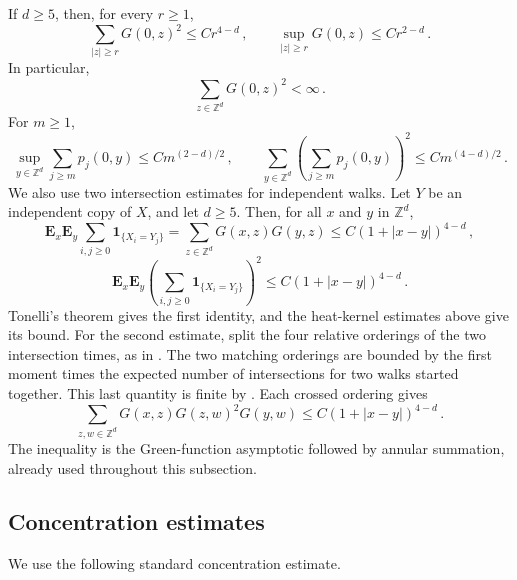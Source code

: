 \documentclass[11pt]{amsart}
\theoremstyle{plain}
\theoremstyle{definition}
\newcommand{\Z}{\mathbb{Z}}
\newcommand{\one}{\mathbf{1}}
\begin{document}
	If $d\geq5$, then, for every $r\geq1$,
	\begin{equation}\label{eq:dgt4-green-tail}
		\sum_{|z|\geq r}G(0,z)^2\leq Cr^{4-d}\, ,
		\qquad
		\sup_{|z|\geq r}G(0,z)\leq Cr^{2-d}\, .
	\end{equation}
		In particular,
	\begin{equation}\label{eq:dgt4-green-l2}
		\sum_{z\in\Z^d}G(0,z)^2<\infty\, .
	\end{equation}
	For $m\geq1$,
		\begin{equation}\label{eq:dgt4-tail-kernel}
			\sup_{y\in\Z^d}\sum_{j\geq m}p_j(0,y)\leq C m^{(2-d)/2}\, ,
			\qquad
			\sum_{y\in\Z^d}\left(\sum_{j\geq m}p_j(0,y)\right)^2
			\leq C m^{(4-d)/2}\, .
		\end{equation}
		We also use two intersection estimates for independent walks. Let $Y$ be
		an independent copy of $X$, and let $d\geq5$. Then, for all $x$ and $y$
		in $\Z^d$,
		\begin{equation}\label{eq:dgt4-intersection-first-moment}
			\mathbf E_x\mathbf E_y
			\sum_{i,j\geq0}\one_{\{X_i=Y_j\}}
			= \sum_{z\in\Z^d}G(x,z)G(y,z)
			\leq C(1+|x-y|)^{4-d}\, ,
        \end{equation}    
        \begin{equation}\label{eq:dgt4-intersection-second-moment}
			\mathbf E_x\mathbf E_y
			\left(\sum_{i,j\geq0}\one_{\{X_i=Y_j\}}\right)^2
			\leq
			C(1+|x-y|)^{4-d}\, .
		\end{equation}
		Tonelli's theorem gives the first identity, and the heat-kernel estimates
		above give its bound. For the second estimate, split the four relative
		orderings of the two intersection times, as in
		\citet[proof of Theorem~3.3.2, pp.~95--97]{LawlerInt}. The two matching
		orderings are bounded by the first moment times the expected number of
		intersections for two walks started together. This last quantity is
		finite by \citet[Proposition~3.2.1, pp.~89--90]{LawlerInt}. Each crossed
		ordering gives
		\[
			\sum_{z,w\in\Z^d}
			G(x,z)G(z,w)^2G(y,w)
			\leq C(1+|x-y|)^{4-d}\, .
		\]
		The inequality is the Green-function asymptotic followed by annular
		summation, already used throughout this subsection.

\subsection{Concentration estimates}\label{ssec:concentration}

	We use the following standard concentration estimate.
\end{document}
